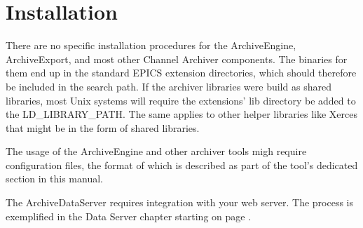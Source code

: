 \section{Installation}
There are no specific installation procedures for the ArchiveEngine,
ArchiveExport, and most other Channel Archiver components. The
binaries for them end up in the standard EPICS extension directories,
which should therefore be included in the search path. If the archiver
libraries were build as shared libraries, most Unix systems will
require the extensions' lib directory be added to the
LD\_LIBRARY\_PATH. The same applies to other helper libraries like
Xerces that might be in the form of shared libraries.

The usage of the ArchiveEngine and other archiver tools migh require
configuration files, the format of which is described as part of the
tool's dedicated section in this manual.

The ArchiveDataServer requires integration with your web server. The
process is exemplified in the Data Server chapter starting on page
\pageref{sec:dataserver}.

